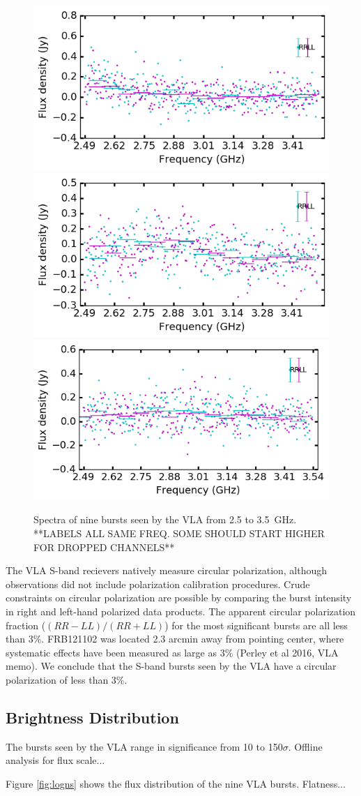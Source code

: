 \documentclass{emulateapj}
\begin{document}
\begin{figure}[h!]
\begin{center}
 \begin{minipage}{2\columnwidth}
  \includegraphics[width=0.3\columnwidth]{spec_57646.png}
  \includegraphics[width=0.3\columnwidth]{spec_57648.png}
  \includegraphics[width=0.3\columnwidth]{spec_57649.png}
 \end{minipage}
\caption{Spectra of nine bursts seen by the VLA from 2.5 to 3.5~GHz.  **LABELS ALL SAME FREQ. SOME SHOULD START HIGHER FOR DROPPED CHANNELS**
 \label{fig:spec}}
\end{center}
\end{figure}

The VLA S-band recievers natively measure circular polarization, although observations did not include polarization calibration procedures. Crude constraints on circular polarization are possible by comparing the burst intensity in right and left-hand polarized data products. The apparent circular polarization fraction ($(RR-LL)/(RR+LL)$) for the most significant bursts are all less than 3\%. FRB121102 was located 2.3 arcmin away from pointing center, where systematic effects have been measured as large as 3\% (Perley et al 2016, VLA memo). We conclude that the S-band bursts seen by the VLA have a circular polarization of less than 3\%.

\subsection{Brightness Distribution}

The bursts seen by the VLA range in significance from 10 to 150$\sigma$. Offline analysis for flux scale...

Figure \ref{fig:logns} shows the flux distribution of the nine VLA bursts. Flatness...
\end{document}
